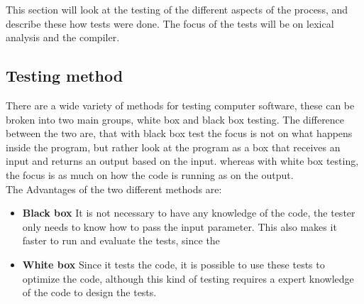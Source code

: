 This section will look at the testing of the different aspects of the process, and describe these how tests were done. The focus of the tests will be on lexical analysis and the compiler.

\subsection*{Testing method}
There are a wide variety of methods for testing computer software, these can be broken into two main groups, white box and black box testing. The difference between the two are, that with black box test the focus is not on what happens inside the program, but rather look at the program as a box that receives an input and returns an output based on the input. whereas with white box testing, the focus is as much on how the code is running as on the output.\\

The Advantages of the two different methods are:
\begin{itemize}
\item[] \textbf{Black box} It is not necessary to have any knowledge of the code, the tester only needs to know how to pass the input parameter. This also makes it faster to run and evaluate the tests, since the 
\item[] \textbf{White box} Since it tests the code, it is possible to use these tests to optimize the code, although this kind of testing requires a expert knowledge of the code to design the tests. 
\end{itemize}   

